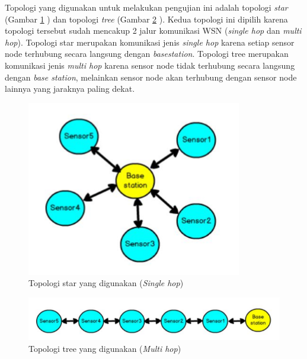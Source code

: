 Topologi yang digunakan untuk melakukan pengujian ini adalah topologi \textit{star} (Gambar \ref{fig:star_pengujian} ) dan topologi \textit{tree} (Gambar \ref{fig:tree_pengujian} ). Kedua topologi ini dipilih karena topologi tersebut sudah mencakup 2 jalur komunikasi WSN (\textit{single hop} dan \textit{multi hop}). Topologi star merupakan komunikasi jenis \textit{single hop} karena setiap sensor node terhubung secara langsung dengan \textit{basestation}. Topologi tree merupakan komunikasi jenis \textit{multi hop} karena sensor node tidak terhubung secara langsung dengan \textit{base station}, melainkan sensor node akan terhubung dengan sensor node lainnya yang jaraknya paling dekat.

\begin{figure}[H] 
	\centering  
	\includegraphics[scale=1]{Gambar/Hasil Sensing/star_pengujian.PNG}  
	\caption[Topologi star yang digunakan (\textit{Single hop}]{Topologi star yang digunakan (\textit{Single hop})}
	\label{fig:star_pengujian} 
\end{figure}

\begin{figure}[H] 
	\centering  
	\includegraphics[scale=1]{Gambar/Hasil Sensing/tree_pengujian.PNG}  
	\caption[Topologi tree yang digunakan]{Topologi tree yang digunakan (\textit{Multi hop})}
	\label{fig:tree_pengujian} 
\end{figure}

